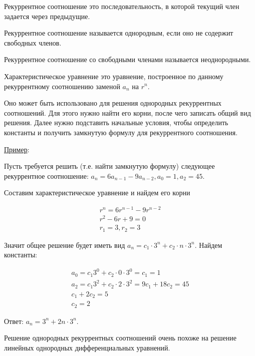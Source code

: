 
\begin{definition}
  Рекуррентное соотношение это последовательность, в которой текущий член
  задается через предыдущие.
\end{definition}

\begin{definition}
  Рекуррентное соотношение называется однородным, если оно не содержит свободных
  членов.

  Рекуррентное соотношение со свободными членами называется неоднородными.
\end{definition}

\begin{definition}
  Характеристическое уравнение это уравнение, построенное по данному
  рекуррентному соотношению заменой \(a_{n}\) на \(r^{n}\).
\end{definition}

Оно может быть использовано для решения однородных рекуррентных соотношений. Для
этого нужно найти его корни, после чего записать общий вид решения. Далее нужно
подставить начальные условия, чтобы определить константы и получить замкнутую
формулу для рекуррентного соотношения.

\underline{Пример}:

Пусть требуется решить (т.е. найти замкнутую формулу) следующее рекуррентное
соотношение: \(a_{n} = 6 a_{n - 1} - 9 a_{n - 2}, a_{0} = 1, a_{2} = 45\).

Составим характеристическое уравнение и найдем его корни

\begin{align*}
  r^{n} = 6 r^{n - 1} - 9 r^{n - 2} \\
  r^{2} - 6 r + 9 = 0 \\
  r_{1} = 3, r_{2} = 3
\end{align*}

Значит общее решение будет иметь вид
\(a_{n} = c_{1} \cdot 3^{n} + c_{2} \cdot n \cdot 3^{n}\).
Найдем константы:

\begin{align*}
  a_{0} = c_{1} 3^{0} + c_{2} \cdot 0 \cdot 3^{0} = c_{1} = 1 \\
  a_{2} = c_{1} 3^{2} + c_{2} \cdot 2 \cdot 3^{2} = 9 c_{1} + 18 c_{2} = 45 \\
  c_{1} + 2 c_{2} = 5 \\
  c_{2} = 2
\end{align*}

Ответ: \(a_{n} = 3^{n} + 2n \cdot 3^{n}\).

\begin{remark}
  Решение однородных рекуррентных соотношений очень похоже на решение линейных
  однородных дифференциальных уравнений.
\end{remark}
